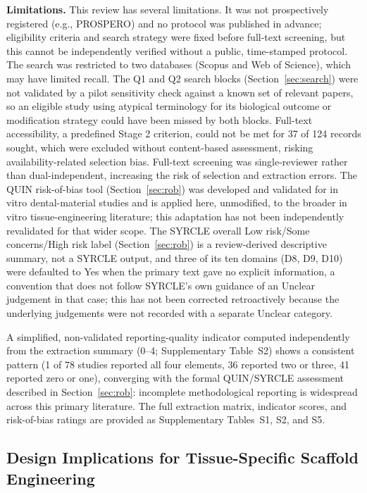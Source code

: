 \documentclass[5p,times,twocolumn]{elsarticle}
\begin{document}
\textbf{Limitations.} This review has several limitations. It was not prospectively registered (e.g., PROSPERO) and no protocol was published in advance; eligibility criteria and search strategy were fixed before full-text screening, but this cannot be independently verified without a public, time-stamped protocol. The search was restricted to two databases (Scopus and Web of Science), which may have limited recall. The Q1 and Q2 search blocks (Section~\ref{sec:search}) were not validated by a pilot sensitivity check against a known set of relevant papers, so an eligible study using atypical terminology for its biological outcome or modification strategy could have been missed by both blocks. Full-text accessibility, a predefined Stage 2 criterion, could not be met for 37 of 124 records sought, which were excluded without content-based assessment, risking availability-related selection bias. Full-text screening was single-reviewer rather than dual-independent, increasing the risk of selection and extraction errors. The QUIN risk-of-bias tool (Section~\ref{sec:rob}) was developed and validated for in vitro dental-material studies and is applied here, unmodified, to the broader in vitro tissue-engineering literature; this adaptation has not been independently revalidated for that wider scope. The SYRCLE overall Low risk/Some concerns/High risk label (Section~\ref{sec:rob}) is a review-derived descriptive summary, not a SYRCLE output, and three of its ten domains (D8, D9, D10) were defaulted to Yes when the primary text gave no explicit information, a convention that does not follow SYRCLE's own guidance of an Unclear judgement in that case; this has not been corrected retroactively because the underlying judgements were not recorded with a separate Unclear category.

A simplified, non-validated reporting-quality indicator computed independently from the extraction summary (0--4; Supplementary Table~S2) shows a consistent pattern (1 of 78 studies reported all four elements, 36 reported two or three, 41 reported zero or one), converging with the formal QUIN/SYRCLE assessment described in Section~\ref{sec:rob}: incomplete methodological reporting is widespread across this primary literature. The full extraction matrix, indicator scores, and risk-of-bias ratings are provided as Supplementary Tables~S1, S2, and S5.

\subsection{Design Implications for Tissue-Specific Scaffold Engineering}
\label{sec:design-implications}
\end{document}
